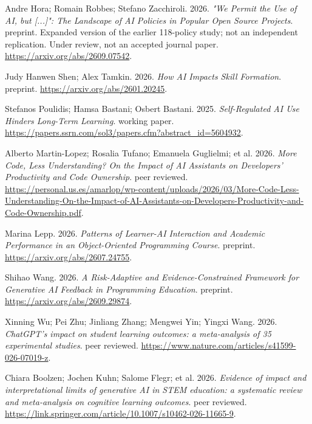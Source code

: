 {\begin{description}[leftmargin=2em,labelwidth=1.5em,itemsep=1pt,parsep=0pt]
\item[58.] \hypertarget{ref-horapolicies2026}{} Andre Hora; Romain Robbes; Stefano Zacchiroli. 2026. \textit{"We Permit the Use of AI, but [...]": The Landscape of AI Policies in Popular Open Source Projects}. preprint. Expanded version of the earlier 118-policy study; not an independent replication. Under review, not an accepted journal paper. \url{https://arxiv.org/abs/2609.07542}.

\item[59.] \hypertarget{ref-shen2026}{} Judy Hanwen Shen; Alex Tamkin. 2026. \textit{How AI Impacts Skill Formation}. preprint. \url{https://arxiv.org/abs/2601.20245}.

\item[60.] \hypertarget{ref-ref-283d4e8368}{} Stefanos Poulidis; Hamsa Bastani; Osbert Bastani. 2025. \textit{Self-Regulated AI Use Hinders Long-Term Learning}. working paper. \url{https://papers.ssrn.com/sol3/papers.cfm?abstract\_id=5604932}.

\item[61.] \hypertarget{ref-ownership2026}{} Alberto Martin-Lopez; Rosalia Tufano; Emanuela Guglielmi; et al. 2026. \textit{More Code, Less Understanding? On the Impact of AI Assistants on Developers' Productivity and Code Ownership}. peer reviewed. \url{https://personal.us.es/amarlop/wp-content/uploads/2026/03/More-Code-Less-Understanding-On-the-Impact-of-AI-Assistants-on-Developers-Productivity-and-Code-Ownership.pdf}.

\item[62.] \hypertarget{ref-lepp2026}{} Marina Lepp. 2026. \textit{Patterns of Learner-AI Interaction and Academic Performance in an Object-Oriented Programming Course}. preprint. \url{https://arxiv.org/abs/2607.24755}.

\item[63.] \hypertarget{ref-wang2026}{} Shihao Wang. 2026. \textit{A Risk-Adaptive and Evidence-Constrained Framework for Generative AI Feedback in Programming Education}. preprint. \url{https://arxiv.org/abs/2609.29874}.

\item[64.] \hypertarget{ref-wulearning2026}{} Xinning Wu; Pei Zhu; Jinliang Zhang; Mengwei Yin; Yingxi Wang. 2026. \textit{ChatGPT's impact on student learning outcomes: a meta-analysis of 35 experimental studies}. peer reviewed. \url{https://www.nature.com/articles/s41599-026-07019-z}.

\item[65.] \hypertarget{ref-boolzen2026}{} Chiara Boolzen; Jochen Kuhn; Salome Flegr; et al. 2026. \textit{Evidence of impact and interpretational limits of generative AI in STEM education: a systematic review and meta-analysis on cognitive learning outcomes}. peer reviewed. \url{https://link.springer.com/article/10.1007/s10462-026-11665-9}.


\end{description}}
